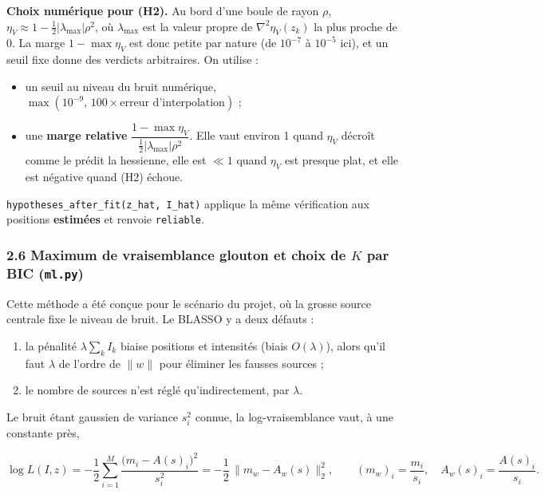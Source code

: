 \documentclass[
  french,
]{article}
\providecommand{\tightlist}{%
  \setlength{\itemsep}{0pt}\setlength{\parskip}{0pt}}
\begin{document}
\textbf{Choix numérique pour (H2).} Au bord d'une boule de rayon
\(\rho\), \(\eta_V\approx 1-\tfrac12\lvert\lambda_{\max}\rvert\rho^2\),
où \(\lambda_{\max}\) est la valeur propre de \(\nabla^2\eta_V(z_k)\) la
plus proche de 0. La marge \(1-\max\eta_V\) est donc petite par nature
(de \(10^{-7}\) à \(10^{-5}\) ici), et un seuil fixe donne des verdicts
arbitraires. On utilise :

\begin{itemize}
\tightlist
\item
  un seuil au niveau du bruit numérique,
  \(\max(10^{-9},\,100\times\text{erreur d'interpolation})\) ;
\item
  une \textbf{marge relative}
  \(\dfrac{1-\max\eta_V}{\tfrac12\lvert\lambda_{\max}\rvert\rho^2}\).
  Elle vaut environ 1 quand \(\eta_V\) décroît comme le prédit la
  hessienne, elle est \(\ll 1\) quand \(\eta_V\) est presque plat, et
  elle est négative quand (H2) échoue.
\end{itemize}

\texttt{hypotheses\_after\_fit(z\_hat,\ I\_hat)} applique la même
vérification aux positions \textbf{estimées} et renvoie
\texttt{reliable}.

\subsubsection{\texorpdfstring{2.6 Maximum de vraisemblance glouton et
choix de \(K\) par BIC
(\texttt{ml.py})}{2.6 Maximum de vraisemblance glouton et choix de K par BIC (ml.py)}}\label{maximum-de-vraisemblance-glouton-et-choix-de-k-par-bic-ml.py}

Cette méthode a été conçue pour le scénario du projet, où la grosse
source centrale fixe le niveau de bruit. Le BLASSO y a deux défauts :

\begin{enumerate}
\def\labelenumi{\arabic{enumi}.}
\tightlist
\item
  la pénalité \(\lambda\sum_k I_k\) biaise positions et intensités
  (biais \(O(\lambda)\)), alors qu'il faut \(\lambda\) de l'ordre de
  \(\lVert w\rVert\) pour éliminer les fausses sources ;
\item
  le nombre de sources n'est réglé qu'indirectement, par \(\lambda\).
\end{enumerate}

Le bruit étant gaussien de variance \(s_i^2\) connue, la
log-vraisemblance vaut, à une constante près,

\[
\log L(I, z) = -\frac12\sum_{i=1}^{M}\frac{\big(m_i - A(s)_i\big)^2}{s_i^2}
= -\frac12\,\big\lVert m_w - A_w(s)\big\rVert_2^2,
\qquad (m_w)_i = \frac{m_i}{s_i},\quad A_w(s)_i = \frac{A(s)_i}{s_i}.
\]
\end{document}
